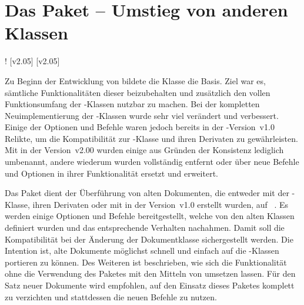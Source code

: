 \section{Das Paket  -- Umstieg von anderen Klassen}
\begin{Declaration*}{}!
%
[v2.05]
[v2.05]
%
\noindent{}

\bigskip\noindent
Zu Beginn der Entwicklung von \TUDScript bildete die Klasse 
die Basis. Ziel war es, sämtliche Funktionalitäten dieser beizubehalten und 
zusätzlich den vollen Funktionsumfang der \KOMAScript-Klassen nutzbar zu 
machen. Bei der kompletten Neuimplementierung der \TUDScript-Klassen wurde sehr 
viel verändert und verbessert. Einige der Optionen und Befehle waren jedoch 
bereits in der \TUDScript-Version~v1.0 Relikte, um die Kompatibilität zur 
-Klasse und ihren Derivaten zu gewährleisten. Mit \TUDScript in 
der Version~v2.00 wurden einige aus Gründen der Konsistenz lediglich umbenannt, 
andere wiederum wurden vollständig entfernt oder über neue Befehle und Optionen 
in ihrer Funktionalität ersetzt und erweitert. 

Das Paket  dient der Überführung von alten Dokumenten, die 
entweder mit der -Klasse, ihren Derivaten oder mit \TUDScript in 
der Version~v1.0 erstellt wurden, auf \TUDScript~\vTUDScript. Es werden einige 
Optionen und Befehle bereitgestellt, welche von den alten Klassen definiert 
wurden und das entsprechende Verhalten nachahmen. Damit soll die Kompatibilität 
bei der Änderung der Dokumentklasse sichergestellt werden. Die Intention ist, 
alte Dokumente möglichst schnell und einfach auf die \TUDScript-Klassen 
portieren zu können. Des Weiteren ist beschrieben, wie sich die Funktionalität 
ohne die Verwendung des Paketes  mit den Mitteln von 
\TUDScript umsetzen lassen. Für den Satz neuer Dokumente wird empfohlen, auf 
den Einsatz dieses Paketes komplett zu verzichten und stattdessen die neuen 
Befehle zu nutzen.


\end{Declaration*}
